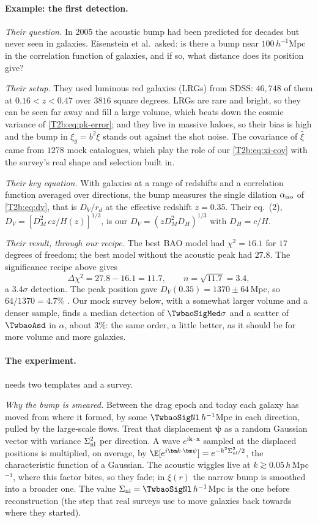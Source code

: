 \paragraph{Example: the first detection.} \emph{Their question.} In 2005 the acoustic bump had been predicted for decades but never seen in galaxies. Eisenstein et al.\ asked: is there a bump near $100\,h^{-1}$Mpc in the correlation function of galaxies, and if so, what distance does its position give?

\emph{Their setup.} They used luminous red galaxies (LRGs) from SDSS: $46{,}748$ of them at $0.16<z<0.47$ over $3816$ square degrees. LRGs are rare and bright, so they can be seen far away and fill a large volume, which beats down the cosmic variance of \eqref{T2b:eq:pk-error}; and they live in massive haloes, so their bias is high and the bump in $\xi_g=b^2\xi$ stands out against the shot noise. The covariance of $\hat\xi$ came from $1278$ mock catalogues, which play the role of our \eqref{T2b:eq:xi-cov} with the survey's real shape and selection built in.

\emph{Their key equation.} With galaxies at a range of redshifts and a correlation function averaged over directions, the bump measures the single dilation $\alpha_{\rm iso}$ of \eqref{T2b:eq:dv}, that is $D_V/r_d$ at the effective redshift $z=0.35$. Their eq.~(2), $D_V=[D_M^2\,cz/H(z)]^{1/3}$, is our $D_V=(zD_M^2D_H)^{1/3}$ with $D_H=c/H$.

\emph{Their result, through our recipe.} The best BAO model had $\chi^2=16.1$ for $17$ degrees of freedom; the best model without the acoustic peak had $27.8$. The significance recipe above gives
\[
  \Delta\chi^2=27.8-16.1=11.7,\qquad n=\sqrt{11.7}=3.4 ,
\]
a $3.4\sigma$ detection. The peak position gave $D_V(0.35)=1370\pm64$\,Mpc, so $64/1370=4.7\%$ \cite[Sec.~4, Fig.~6]{Eisenstein2005}. Our mock survey below, with a somewhat larger volume and a denser sample, finds a median detection of $\TwbaoSigMed\sigma$ and a scatter of $\TwbaoAsd$ in $\alpha$, about $3\%$: the same order, a little better, as it should be for more volume and more galaxies.

\paragraph{The experiment.}  needs two templates and a survey.

\emph{Why the bump is smeared.} Between the drag epoch and today each galaxy has moved from where it formed, by some $\TwbaoSigNl\,h^{-1}$Mpc in each direction, pulled by the large-scale flows. Treat that displacement $\bm\psi$ as a random Gaussian vector with variance $\Sigma_{\rm nl}^2$ per direction. A wave $e^{i\bm k\cdot\bm x}$ sampled at the displaced positions is multiplied, on average, by $\E[e^{i\bm k\cdot\bm\psi}]=e^{-k^2\Sigma_{\rm nl}^2/2}$, the characteristic function of a Gaussian. The acoustic wiggles live at $k\gtrsim0.05\,h$\,Mpc$^{-1}$, where this factor bites, so they fade; in $\xi(r)$ the narrow bump is smoothed into a broader one. The value $\Sigma_{\rm nl}=\TwbaoSigNl\,h^{-1}$Mpc is the one before reconstruction (the step that real surveys use to move galaxies back towards where they started).

